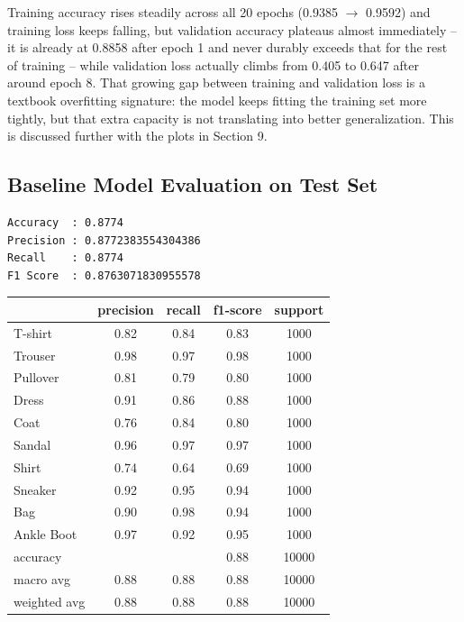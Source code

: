 \documentclass[11pt]{article}
\begin{document}
Training accuracy rises steadily across all 20 epochs (0.9385 $\rightarrow$ 0.9592) and training loss keeps falling, but validation accuracy plateaus almost immediately -- it is already at 0.8858 after epoch 1 and never durably exceeds that for the rest of training -- while validation loss actually climbs from 0.405 to 0.647 after around epoch 8. That growing gap between training and validation loss is a textbook overfitting signature: the model keeps fitting the training set more tightly, but that extra capacity is not translating into better generalization. This is discussed further with the plots in Section 9.

\subsection{Baseline Model Evaluation on Test Set}
\begin{verbatim}
Accuracy  : 0.8774
Precision : 0.8772383554304386
Recall    : 0.8774
F1 Score  : 0.8763071830955578
\end{verbatim}

\begin{center}
\begin{tabular}{lcccc}
\toprule
 & precision & recall & f1-score & support \\
\midrule
T-shirt     & 0.82 & 0.84 & 0.83 & 1000 \\
Trouser     & 0.98 & 0.97 & 0.98 & 1000 \\
Pullover    & 0.81 & 0.79 & 0.80 & 1000 \\
Dress       & 0.91 & 0.86 & 0.88 & 1000 \\
Coat        & 0.76 & 0.84 & 0.80 & 1000 \\
Sandal      & 0.96 & 0.97 & 0.97 & 1000 \\
Shirt       & 0.74 & 0.64 & 0.69 & 1000 \\
Sneaker     & 0.92 & 0.95 & 0.94 & 1000 \\
Bag         & 0.90 & 0.98 & 0.94 & 1000 \\
Ankle Boot  & 0.97 & 0.92 & 0.95 & 1000 \\
\midrule
accuracy    &      &      & 0.88 & 10000 \\
macro avg   & 0.88 & 0.88 & 0.88 & 10000 \\
weighted avg& 0.88 & 0.88 & 0.88 & 10000 \\
\bottomrule
\end{tabular}
\end{center}
\end{document}
